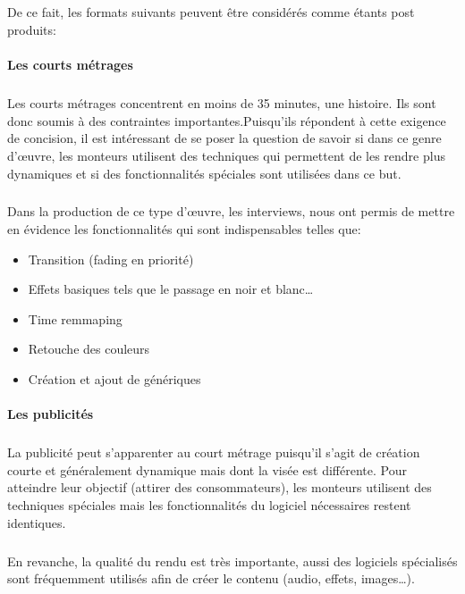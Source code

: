 \subparagraph{}
De ce fait, les formats suivants peuvent être considérés comme étants post produits:

\paragraph{Les courts métrages}

\subparagraph{}
Les courts métrages concentrent en moins de 35 minutes, une histoire. Ils sont donc soumis
à des contraintes importantes.Puisqu'ils répondent à cette exigence de concision,
il est intéressant de se poser la question de savoir si dans ce genre
d'œuvre, les monteurs utilisent des techniques qui permettent
de les rendre plus dynamiques et si des fonctionnalités spéciales sont utilisées dans
ce but.

\subparagraph{}
Dans la production de ce type d'œuvre, les interviews, nous ont permis de mettre en évidence
les fonctionnalités qui sont indispensables telles que:
\begin{itemize}
  \item{Transition (fading en priorité)}
  \item{Effets basiques tels que le passage en noir et blanc\ldots}
  \item{Time remmaping}
  \item{Retouche des couleurs}
  \item{Création et ajout de génériques}
\end{itemize}

\paragraph {Les publicités}
\subparagraph{}
La publicité peut s'apparenter au court métrage puisqu'il s'agit de création
courte et généralement dynamique mais dont la visée est différente. Pour atteindre
leur objectif (attirer des consommateurs), les monteurs utilisent des
techniques spéciales mais les fonctionnalités du logiciel nécessaires restent
identiques.

\subparagraph{}
En revanche, la qualité du rendu est très importante, aussi des logiciels spécialisés
sont fréquemment utilisés afin de créer le contenu (audio, effets, images\ldots).

